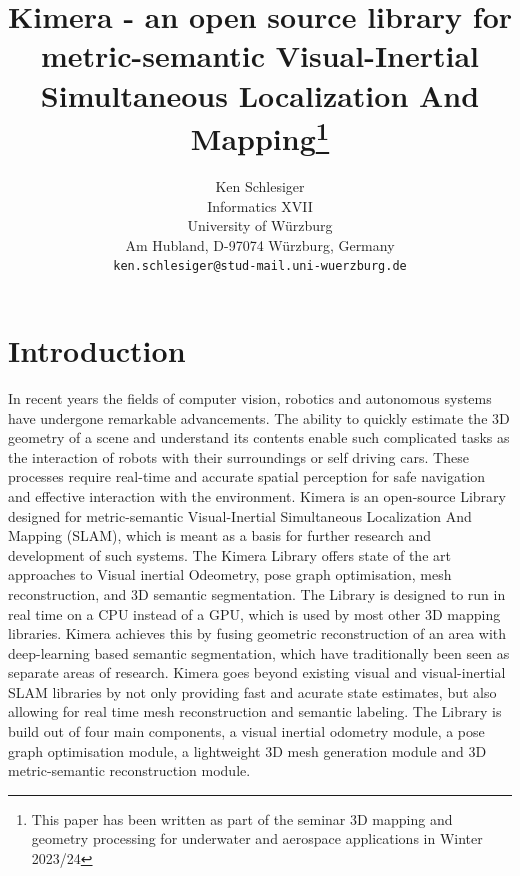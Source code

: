 \documentclass[11pt,a4paper]{article}
\begin{document}
\title{\Large\bf Kimera - an open source library for metric-semantic Visual-Inertial Simultaneous Localization And Mapping\footnote{This paper has been written as part of the seminar 3D mapping and geometry processing for underwater and aerospace applications in Winter 2023/24}}

\author{Ken Schlesiger\\
  Informatics XVII \\
  University of Würzburg\\
  Am Hubland, D-97074 Würzburg, Germany\\
{\small \texttt{ken.schlesiger@stud-mail.uni-wuerzburg.de}}}

\date{}

\maketitle

\newpage

\section{Introduction}\label{Sec:Intro}
In recent years the fields of computer vision, robotics and autonomous systems have undergone remarkable advancements. The ability to quickly estimate the 3D geometry of a scene and understand its contents enable such complicated tasks as the interaction of robots with their surroundings or self driving cars. 
These processes require real-time and accurate spatial perception for safe navigation and effective interaction with the environment.
Kimera \cite{rosinol2020kimera} is an open-source Library designed for metric-semantic Visual-Inertial Simultaneous Localization And Mapping (SLAM), which is meant as a basis for further research and development of such systems. The Kimera Library offers state of the art approaches to Visual inertial Odeometry, pose graph optimisation, mesh reconstruction, and 3D semantic segmentation.
The Library is designed to run in real time on a CPU instead of a GPU, which is used by most other 3D mapping libraries. 
Kimera achieves this by fusing geometric reconstruction of an area with deep-learning based semantic segmentation, which have traditionally been seen as separate areas of research. 
Kimera goes beyond existing visual and visual-inertial SLAM libraries by not only providing fast and acurate state estimates, but also allowing for real time mesh reconstruction and semantic labeling.
The Library is build out of four main components, a visual inertial odometry module, a pose graph optimisation module, a lightweight 3D mesh generation module and 3D metric-semantic reconstruction module.
\end{document}
